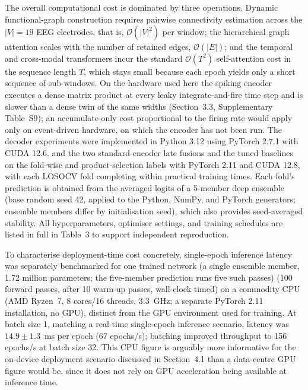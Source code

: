 \documentclass[pdflatex,sn-basic,Numbered]{sn-jnl}
\begin{document}
The overall computational cost is dominated by three operations. Dynamic functional-graph construction requires pairwise connectivity estimation across the $|V|=19$ EEG electrodes, that is, $\mathcal{O}(|V|^2)$ per window; the hierarchical graph attention scales with the number of retained edges, $\mathcal{O}(|E|)$; and the temporal and cross-modal transformers incur the standard $\mathcal{O}(T^2)$ self-attention cost in the sequence length $T$, which stays small because each epoch yields only a short sequence of sub-windows. On the hardware used here the spiking encoder executes a dense matrix product at every leaky integrate-and-fire time step and is slower than a dense twin of the same widths (Section~3.3, Supplementary Table~S9); an accumulate-only cost proportional to the firing rate would apply only on event-driven hardware, on which the encoder has not been run. The decoder experiments were implemented in Python 3.12 using PyTorch 2.7.1 with CUDA 12.6, and the two standard-encoder late fusions and the tuned baselines on the fold-wise and product-selection labels with PyTorch 2.11 and CUDA 12.8, with each LOSOCV fold completing within practical training times. Each fold's prediction is obtained from the averaged logits of a 5-member deep ensemble (base random seed 42, applied to the Python, NumPy, and PyTorch generators; ensemble members differ by initialisation seed), which also provides seed-averaged stability. All hyperparameters, optimiser settings, and training schedules are listed in full in Table~3 to support independent reproduction.

To characterise deployment-time cost concretely, single-epoch inference latency was separately benchmarked for one trained network (a single ensemble member, 1.72 million parameters; the five-member prediction runs five such passes) (100 forward passes, after 10 warm-up passes, wall-clock timed) on a commodity CPU (AMD Ryzen~7, 8 cores/16 threads, 3.3~GHz; a separate PyTorch 2.11 installation, no GPU), distinct from the GPU environment used for training. At batch size 1, matching a real-time single-epoch inference scenario, latency was $14.9\pm1.3$~ms per epoch (67 epochs/s); batching improved throughput to 156 epochs/s at batch size 32. This CPU figure is arguably more informative for the on-device deployment scenario discussed in Section~4.1 than a data-centre GPU figure would be, since it does not rely on GPU acceleration being available at inference time.
\end{document}
